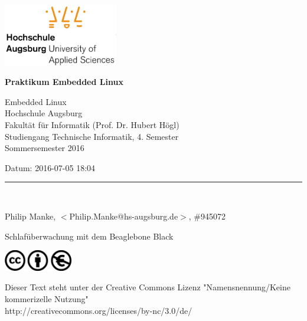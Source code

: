 




















\ \ 
\hfill
\begin{minipage}[t]{5cm}
\includegraphics[width=5cm]{img/hsa-logo.jpg}
\end{minipage}

\vskip 10mm

{\parindent=0pt

\thispagestyle{empty}


{\Large\bf Praktikum Embedded Linux
}

\vskip 5mm

Embedded Linux \\
Hochschule Augsburg \\
Fakultät für Informatik (Prof. Dr. Hubert Högl) \\
Studiengang Technische Informatik, 4. Semester \\

Sommersemester 2016
 

Datum: 2016-07-05 18:04 \\

\medskip

\rule{10cm}{4pt}\\

\medskip

Philip Manke, $<$Philip.Manke@hs-augsburg.de$>$, \#945072 \\


\vskip 2cm

\begin{center}
{\LARGE\bf

Schlafüberwachung mit dem Beaglebone Black

}
\end{center}

\vfill

\begin{minipage}[t]{3cm}
\includegraphics[width=3cm]{img/cc-logo.jpg}
\end{minipage}

{\small
Dieser Text steht unter der Creative Commons Lizenz "Namensnennung/Keine kommerizelle Nutzung"\\
http://creativecommons.org/licenses/by-nc/3.0/de/
}

} %


\newpage
